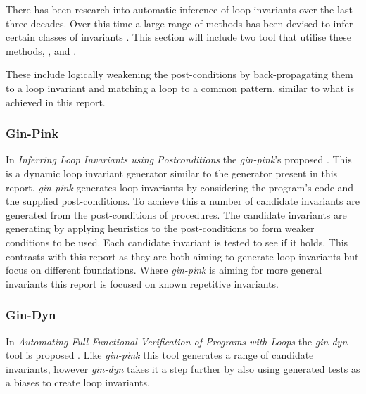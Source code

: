 There has been research into automatic inference of loop invariants over
the last three decades.
Over this time a large range of methods has been devised to infer certain
classes of invariants \cite{infer-dynamic}\cite{infer-postconditions}\cite{struct-induction}.
This section will include two tool that utilise these methods,
 \cite{infer-postconditions}, and  \cite{infer-dyn}.

These include logically weakening the post-conditions by back-propagating them
to a loop invariant \cite{infer-postconditions}\cite{infer-dynamic} and
matching a loop to a common pattern\cite{pattern-loop-inv}, similar to what is achieved in this
report.


\subsubsection{Gin-Pink}

In \textit{Inferring Loop Invariants using Postconditions} 
the \textit{gin-pink}'s proposed \cite{infer-postconditions}.
This is a dynamic loop invariant generator similar to the generator
present in this report.
\textit{gin-pink} generates loop invariants by considering the program's code
and the supplied post-conditions.
To achieve this a number of candidate invariants are generated from the 
post-conditions of procedures.
The candidate invariants are generating by applying heuristics to the
post-conditions to form weaker conditions to be used.
Each candidate invariant is tested to see if it holds.
This contrasts with this report as they are both aiming to generate loop
invariants but focus on different foundations.
Where \textit{gin-pink} is aiming for more general invariants 
this report is focused on known repetitive invariants.

\subsubsection{Gin-Dyn}

In \textit{Automating Full Functional Verification of Programs with Loops} the
\textit{gin-dyn} tool is proposed \cite{infer-dynamic}.
Like \textit{gin-pink} this tool generates a range of candidate invariants,
however \textit{gin-dyn} takes it a step further by also using generated tests
as a biases to create loop invariants.



